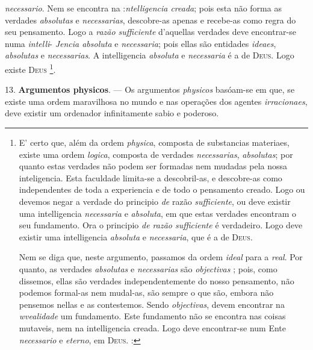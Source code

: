  \emph{necessario}. Nem se encontra na :\emph{ntelligencia creada}; pois esta não forma as verdades \emph{absolutas} e \emph{necessarias}, descobre-as apenas e recebe-as como regra do seu pensamento. Logo a \emph{razão sufficiente} d'aquellas verdades deve encontrar-se numa \emph{intelli}- \emph{Jencia absoluta} e \emph{necessaria}; pois ellas são entidades \emph{ideaes}, \emph{absolutas} e \emph{necessarias}. A intelligencia \emph{absoluta} e \emph{necessaria} é a de \textsc{Deus}. Logo existe \textsc{Deus} \footnote{E' certo que, além da ordem \emph{physica}, composta de substancias materiaes, existe uma ordem \emph{logica}, composta de verdades \emph{necessarias}, \emph{absolutas}; por quanto estas verdades não podem ser formadas nem mudadas pela nossa inteligencia. Esta faculdade limita-se a descobril-as, e descobre-as como independentes de toda a experiencia e de todo o pensamento creado. Logo ou devemos negar a verdade do principio \emph{de} razão \emph{sufficiente}, ou deve existir uma intelligencia \emph{necessaria} e \emph{absoluta}, em que estas verdades encontram o seu fundamento. Ora o principio \emph{de razão sufficiente} é verdadeiro. Logo deve existir uma intelligencia \emph{absoluta} e \emph{necessaria}, que é a de \textsc{Deus}.\par Nem se diga que, neste argumento, passamos da ordem \emph{ideal} para a \emph{real}. Por quanto, as verdades \emph{absolutas} e \emph{necessarias} são \emph{objectivas} ; pois, como dissemos, ellas são verdades independentemente do nosso pensamento, não podemos formal-as nem mudal-as, são sempre o que são, embora não pensemos nellas e as contestemos. Sendo \emph{objectivas}, devem encontrar na \emph{wvealidade} um fundamento. Este fundamento não se encontra nas coisas mutaveis, nem na intelligencia creada. Logo deve encontrar-se num Ente \emph{necessario} e \emph{eterno}, em \textsc{Deus}. :}.

13. \textbf{Argumentos physicos}. --- Os argumentos \emph{physicos} basóam-se em que, se existe uma ordem maravilhosa no mundo e nas operações dos agentes \emph{irracionaes}, deve existir um ordenador infinitamente sabio e poderoso.

